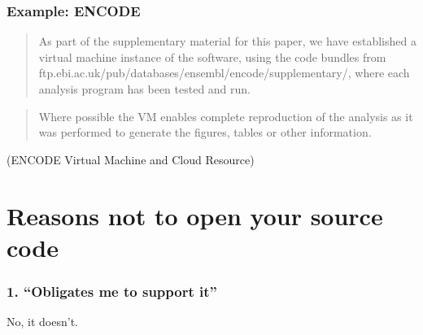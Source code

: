 \documentclass[slidestop]{beamer}
\begin{document}
\begin{frame}
  \frametitle{Example: ENCODE}
  \begin{quote}
    As part of the supplementary material for this paper, we have established
    a virtual machine instance of the software, using the code bundles from
    ftp.ebi.ac.uk/pub/databases/ensembl/encode/supplementary/, where each
    analysis program has been tested and run.
  \end{quote}
  \begin{quote}
    Where possible the VM enables complete reproduction of the analysis as it
    was performed to generate the figures, tables or other information.
  \end{quote}
  (ENCODE Virtual Machine and Cloud Resource)
\end{frame}

\section*{}


\section{Reasons not to open your source code}

\begin{frame}
  \frametitle{1. ``Obligates me to support it''}
  \pause
  No, it doesn't.
\end{frame}

{
  \frame{}
}
\end{document}
